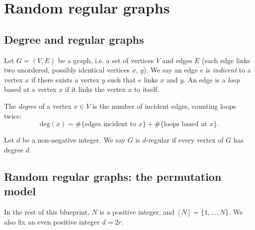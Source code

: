 %

\chapter{Random regular graphs}

\section{Degree and regular graphs}

Let $G = (V, E)$ be a graph, i.e. a set of vertices $V$ and edges $E$ (each edge links two
unordered, possibly identical vertices $x$, $y$). We say an edge $e$ is \emph{indicent} to a vertex
$x$ if there exists a vertex $y$ such that $e$ links $x$ and $y$. An edge is a \emph{loop} based at
a vertex $x$ if it links the vertex $x$ to itself.

\begin{definition}
  The \emph{degree} of a vertex $x \in V$ is the number of incident edges, counting loops twice:
  \begin{equation*}
    \mathrm{deg}(x) = \# \{\text{edges incident to } x\}
    + \# \{ \text{loops based at } x\}.
  \end{equation*}
\end{definition}

\begin{definition}
  Let $d$ be a non-negative integer. We say $G$ is $d$-regular if every vertex of $G$ has degree $d$.
\end{definition}

\section{Random regular graphs: the permutation model}

In the rest of this blueprint, $N$ is a positive integer, and $[N] = \{1, \ldots, N\}$.
We also fix an even positive integer $d = 2r$.

